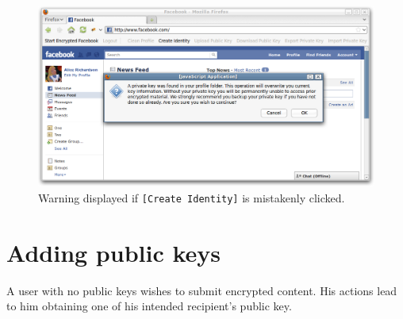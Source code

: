     \begin{figure}[tbph]
        \begin{center}
        
                \includegraphics[width=12cm]{screens/create-warning.png}

            \caption{Warning displayed if {\tt [Create Identity]} is mistakenly clicked.}
            \label{scn:create}
        \end{center}
    \end{figure}

\section{Adding public keys}
\label{app:cw:addkey}
A user with no public keys wishes to submit encrypted content. His actions lead to him obtaining one of his intended recipient's public key.

